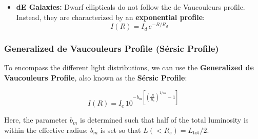 \begin{itemize}
\begin{minipage}{0.52\textwidth}
    
    \vspace{-0.3em}
    \end{minipage}%
    
    \item \textbf{dE Galaxies:} Dwarf ellipticals do not follow the de Vaucouleurs profile. Instead, they are characterized by an \textbf{exponential profile}:
    $$
    I(R) = I_d \, e^{-R/R_d}
    $$
\end{itemize}


\subsubsection{Generalized de Vaucouleurs Profile (Sérsic Profile)}

To encompass the different light distributions, we can use the \textbf{Generalized de Vaucouleurs Profile}, also known as the \textbf{Sérsic Profile}:

$$
I(R) = I_e \, 10^{-b_m \left[ \left(\frac{R}{R_e}\right)^{1/m} - 1 \right]}
$$

Here, the parameter $b_m$ is determined such that half of the total luminosity is within the effective radius: $b_m$ is set so that $L(<R_e) = L_{\text{tot}}/2$.

